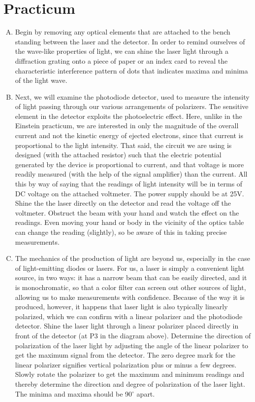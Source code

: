 \section*{Practicum}

\begin{enumerate}[(A)]
	\item Begin by removing any optical elements that are attached to the bench standing between the laser and the detector. In order to remind ourselves of the wave-like properties of light, we can shine the laser light through a diffraction grating onto a piece of paper or an index card to reveal the characteristic interference pattern of dots that indicates maxima and minima of the light wave.

\item Next, we will examine the photodiode detector, used to measure the intensity of light passing through our various arrangements of polarizers. The sensitive element in the detector exploits the photoelectric effect. Here, unlike in the Einstein practicum, we are interested in only the magnitude of the overall current and not the kinetic energy of ejected electrons, since that current is proportional to the light intensity.
That said, the circuit we are using is designed (with the attached resistor) such that the electric potential generated by the device is proportional to current, and that voltage is more readily measured (with the help of the signal amplifier) than the current. All this by way of saying that the readings of light intensity will be in terms of DC voltage on the attached voltmeter. The power supply should be at 25V. Shine the the laser directly on the detector and read the voltage off the voltmeter. Obstruct the beam with your hand and watch the effect on the readings. Even moving your hand or body in the vicinity of the optics table can change the reading (slightly), so be aware of this in taking precise measurements.

\item The mechanics of the production of light are beyond us, especially in the case of light-emitting diodes or lasers. For us, a laser is simply a convenient light source, in two ways: it has a narrow beam that can be easily directed, and it is monochromatic, so that a color filter can screen out other sources of light, allowing us to make measurements with confidence. Because of the way it is produced, however, it happens that laser light is also typically linearly polarized, which we can confirm with a linear polarizer and the photodiode detector. Shine the laser light through a linear polarizer placed directly in front of the detector (at P3 in the diagram above). Determine the direction of polarization of the laser light by adjusting the angle of the linear polarizer to get the maximum signal from the detector.  The zero degree mark for the linear polarizer signifies vertical polarization plus or minus a few degrees.
Slowly rotate the polarizer to get the maximum and minimum readings and thereby determine the direction and degree of polarization of the laser light. The minima and maxima should be 90$^\circ$ apart.



\end{enumerate}
